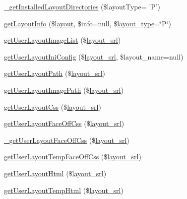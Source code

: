\begin{DoxyCompactItemize}
\item 
\hyperlink{classlayoutModel_a4f50b5c829bf7c601a2938974a9a3b98}{\-\_\-get\-Installed\-Layout\-Directories} (\$layout\-Type= 'P')
\item 
\hyperlink{classlayoutModel_a8f49f0b017ffa5fc1d12efd0dfab7c96}{get\-Layout\-Info} (\$\hyperlink{classlayout}{layout}, \$info=null, \$\hyperlink{ko_8install_8php_a0532d89570cfdaebc628afac2ff5a81b}{layout\-\_\-type}=\char`\"{}P\char`\"{})
\item 
\hyperlink{classlayoutModel_a6bb9dc3b7dc427d7916bf2a743b8e412}{get\-User\-Layout\-Image\-List} (\$\hyperlink{ko_8install_8php_a70054876db09b2519a1726663c8dd9e7}{layout\-\_\-srl})
\item 
\hyperlink{classlayoutModel_acf8661d658078547d762fb582f09e3b9}{get\-User\-Layout\-Ini\-Config} (\$\hyperlink{ko_8install_8php_a70054876db09b2519a1726663c8dd9e7}{layout\-\_\-srl}, \$layout\-\_\-name=null)
\item 
\hyperlink{classlayoutModel_ad852fe1c8eab29b23c998560031eabe4}{get\-User\-Layout\-Path} (\$\hyperlink{ko_8install_8php_a70054876db09b2519a1726663c8dd9e7}{layout\-\_\-srl})
\item 
\hyperlink{classlayoutModel_a8d7574bcc9329207e6cc1eb2da163288}{get\-User\-Layout\-Image\-Path} (\$\hyperlink{ko_8install_8php_a70054876db09b2519a1726663c8dd9e7}{layout\-\_\-srl})
\item 
\hyperlink{classlayoutModel_a1c4e0310f7fce01392ddae5eeb849a5c}{get\-User\-Layout\-Css} (\$\hyperlink{ko_8install_8php_a70054876db09b2519a1726663c8dd9e7}{layout\-\_\-srl})
\item 
\hyperlink{classlayoutModel_a82cac2109b93170e8f573576de2eb0d0}{get\-User\-Layout\-Face\-Off\-Css} (\$\hyperlink{ko_8install_8php_a70054876db09b2519a1726663c8dd9e7}{layout\-\_\-srl})
\item 
\hyperlink{classlayoutModel_ab8fbcb8e92739d001e4a010bc5c5cf3b}{\-\_\-get\-User\-Layout\-Face\-Off\-Css} (\$\hyperlink{ko_8install_8php_a70054876db09b2519a1726663c8dd9e7}{layout\-\_\-srl})
\item 
\hyperlink{classlayoutModel_aadc68d3ed9d3706536ff8d93d1aebd56}{get\-User\-Layout\-Temp\-Face\-Off\-Css} (\$\hyperlink{ko_8install_8php_a70054876db09b2519a1726663c8dd9e7}{layout\-\_\-srl})
\item 
\hyperlink{classlayoutModel_ae1d2250f4bb3703f82998937c46a0a57}{get\-User\-Layout\-Html} (\$\hyperlink{ko_8install_8php_a70054876db09b2519a1726663c8dd9e7}{layout\-\_\-srl})
\item 
\hyperlink{classlayoutModel_a19aaacba7d0b1c9bb466534933595381}{get\-User\-Layout\-Temp\-Html} (\$\hyperlink{ko_8install_8php_a70054876db09b2519a1726663c8dd9e7}{layout\-\_\-srl})

\end{DoxyCompactItemize}
